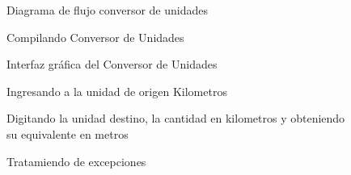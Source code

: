 \documentclass[times,12pt]{article}
\begin{document}
\begin{figure}[h!]

\centering
{}
\caption{Diagrama de flujo conversor de unidades} 

\end{figure}



\begin{figure}[h]

\centering
{}
\caption{Compilando Conversor de Unidades} 

\end{figure}


\begin{figure}[h!]
\centering
{}
\caption{Interfaz gr\'afica del Conversor de Unidades} 
\end{figure}

\begin{figure}[h!]
\centering
{}
\caption{Ingresando a la unidad de origen Kilometros}
\end{figure}

\begin{figure}[h]
\centering
{}
\caption{Digitando la unidad destino, la cantidad en kilometros y obteniendo su equivalente en metros}

\end{figure}

\begin{figure}[h]
\centering
{}
\caption{Tratamiendo de excepciones}

\end{figure}
\end{document}
